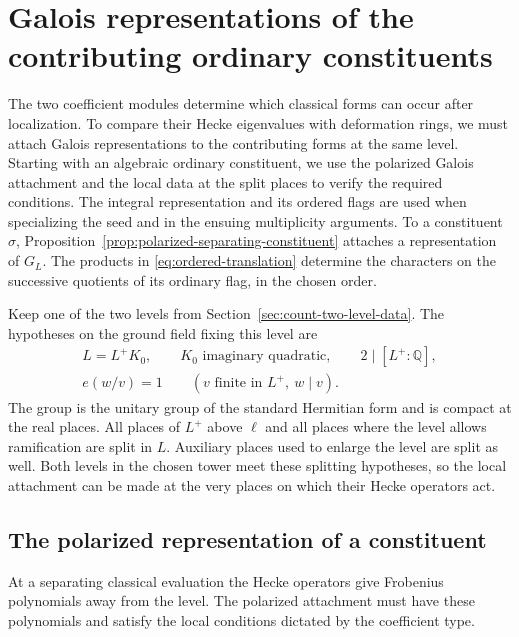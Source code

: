 \section{Galois representations of the contributing ordinary constituents}
\label{sec:count-two-level-attachments}
\hypertarget{source-ordinary-level-attachments}{}

The two coefficient modules determine which classical forms can occur after localization. To compare their Hecke eigenvalues with deformation rings, we must attach Galois representations to the contributing forms at the same level. Starting
with an algebraic ordinary constituent, we use the polarized
Galois attachment and the local data at the split places to
verify the required conditions. The integral representation
and its ordered flags are used when specializing the seed and
in the ensuing multiplicity arguments. To a constituent \(\sigma\), Proposition~\ref{prop:polarized-separating-constituent} attaches a representation of \(G_L\). The products in \eqref{eq:ordered-translation} determine the characters on the successive quotients of its ordinary flag, in the chosen order.

Keep one of the two levels from Section~\ref{sec:count-two-level-data}.
The hypotheses on the ground field fixing this level are
\begin{equation}\label{eq:constituent-cm-field}
 \begin{gathered}
 L=L^+K_0,\qquad K_0\text{ imaginary quadratic},\qquad 2\mid[L^+:\mathbb Q],\\
 e(w/v)=1\qquad (v\text{ finite in }L^+,\ w\mid v).
 \end{gathered}
\end{equation}
The group is the unitary group
of the standard Hermitian form and is compact at the real places.
All places of \(L^+\) above \(\ell\) and all places where the
level allows ramification are split in \(L\). Auxiliary places
used to enlarge the level are split as well. Both levels in the chosen tower meet these splitting hypotheses, so the local attachment can be made at the very places on which their Hecke operators act.

\subsection{The polarized representation of a constituent}

At a separating classical evaluation the Hecke operators give Frobenius polynomials away from the level. The polarized attachment must have these polynomials and satisfy the local conditions dictated by the coefficient type.

